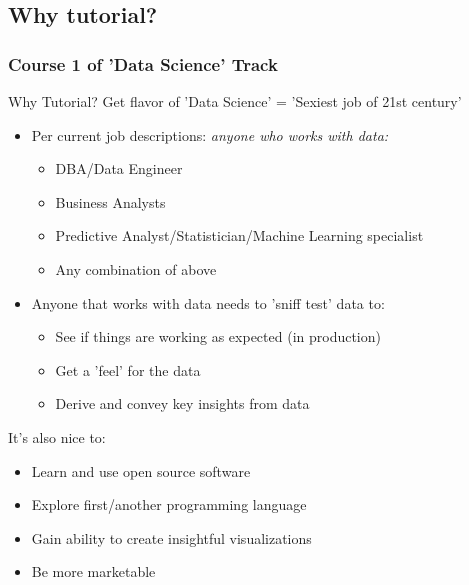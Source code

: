 \subsection{Why tutorial?} 
\normalfont
\begin{frame}
	\frametitle{Course 1 of 'Data Science' Track}
		\begin{alertblock}{Why Tutorial?} 
	Get flavor of 'Data Science' = 'Sexiest job of 21st century'
		\begin{itemize}
			\item Per current job descriptions: \itshape anyone \normalfont who works with data:
					\begin{itemize}
						\item DBA/Data Engineer
						\item Business Analysts
						\item Predictive Analyst/Statistician/Machine Learning specialist
						\item Any combination of above
					\end{itemize}		
  		\item Anyone that works with data needs to 'sniff test' data to:
			\begin{itemize}
				\item See if things are working as expected (in production)
				\item Get a 'feel' for the data
				\item Derive and convey key insights from data
			\end{itemize}
		\end{itemize}
	\end{alertblock}	
\newpage	
		\begin{block}{It's also nice to:}
	  			\begin{itemize}	
	  				\item Learn and use open source software
	  				\item Explore first/another programming language
	  				\item Gain ability to create insightful visualizations
	  				\item Be more marketable 
	  			\end{itemize}
		\end{block}


\end{frame}
